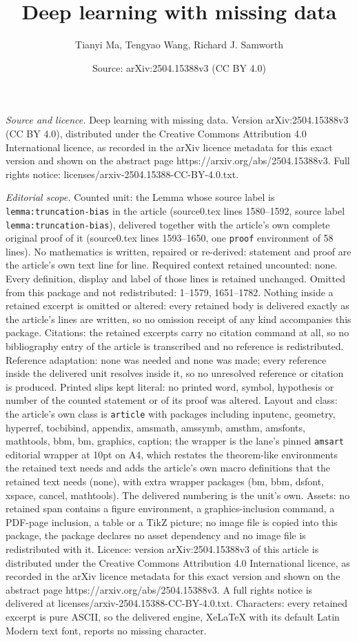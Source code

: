 \documentclass[10pt,a4paper]{amsart}
\title[Deep learning with missing data]{Deep learning with missing data}
\author{Tianyi Ma, Tengyao Wang, Richard J. Samworth}
\date{Source: arXiv:2504.15388v3 (CC BY 4.0)}
\begin{document}
\maketitle

\noindent\emph{Source and licence.} Deep learning with missing data. Version arXiv:2504.15388v3 (CC BY 4.0), distributed under the Creative Commons Attribution 4.0 International licence, as recorded in the arXiv licence metadata for this exact version and shown on the abstract page https://arxiv.org/abs/2504.15388v3. Full rights notice: licenses/arxiv-2504.15388-CC-BY-4.0.txt.\par\smallskip

\noindent\textit{Editorial scope.} Counted unit: the Lemma whose source label is \texttt{lemma:truncation-bias} in the article (source0.tex lines 1580--1592, source label \texttt{lemma:truncation-bias}), delivered together with the article's own complete original proof of it (source0.tex lines 1593--1650, one \texttt{proof} environment of 58 lines). No mathematics is written, repaired or re-derived: statement and proof are the article's own text line for line. Required context retained uncounted: none. Every definition, display and label of those lines is retained unchanged. Omitted from this package and not redistributed: 1--1579, 1651--1782. Nothing inside a retained excerpt is omitted or altered: every retained body is delivered exactly as the article's lines are written, so no omission receipt of any kind accompanies this package. Citations: the retained excerpts carry no citation command at all, so no bibliography entry of the article is transcribed and no reference is redistributed. Reference adaptation: none was needed and none was made; every reference inside the delivered unit resolves inside it, so no unresolved reference or citation is produced. Printed slips kept literal: no printed word, symbol, hypothesis or number of the counted statement or of its proof was altered. Layout and class: the article's own class is \texttt{article} with packages including inputenc, geometry, hyperref, tocbibind, appendix, amsmath, amssymb, amsthm, amsfonts, mathtools, bbm, bm, graphics, caption; the wrapper is the lane's pinned \texttt{amsart} editorial wrapper at 10pt on A4, which restates the theorem-like environments the retained text needs and adds the article's own macro definitions that the retained text needs (none), with extra wrapper packages (bm, bbm, dsfont, xspace, cancel, mathtools). The delivered numbering is the unit's own. Assets: no retained span contains a figure environment, a graphics-inclusion command, a PDF-page inclusion, a table or a TikZ picture; no image file is copied into this package, the package declares no asset dependency and no image file is redistributed with it. Licence: version arXiv:2504.15388v3 of this article is distributed under the Creative Commons Attribution 4.0 International licence, as recorded in the arXiv licence metadata for this exact version and shown on the abstract page https://arxiv.org/abs/2504.15388v3. A full rights notice is delivered at licenses/arxiv-2504.15388-CC-BY-4.0.txt. Characters: every retained excerpt is pure ASCII, so the delivered engine, XeLaTeX with its default Latin Modern text font, reports no missing character.
\end{document}
